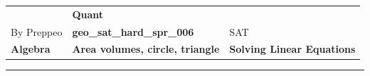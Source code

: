 \documentclass[11pt,paper=a4,answers]{exam}
\begin{document}
\begin{center}
    \centering
    \renewcommand{\arraystretch}{1.5}
    \begin{tabularx}{\textwidth}{YYY}
    & \normalsize\bf{{\Large{{Quant}}}} & \\
    By Preppeo & \normalsize\bf{{geo\_sat\_hard\_spr\_006}} & SAT\\
    \normalsize{{\textbf{{Algebra}} }} & \normalsize{{\textbf{{Area volumes, circle, triangle }} }} & \normalsize{{\textbf{{Solving Linear Equations}} }} \\
    \end{tabularx}
\end{center}
\par\noindent\rule{\textwidth}{1pt}
\end{document}
